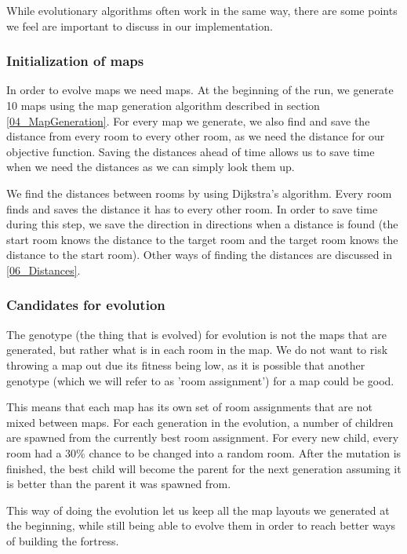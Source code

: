 While evolutionary algorithms often work in the same way, there are some points we feel are important to discuss in our implementation.

\subsubsection{Initialization of maps}
\label{04_Evolution_Initialization}

In order to evolve maps we need maps. At the beginning of the run, we generate 10 maps using the map generation algorithm described in section \ref{04_MapGeneration}. For every map we generate, we also find and save the distance from every room to every other room, as we need the distance for our objective function. Saving the distances ahead of time allows us to save time when we need the distances as we can simply look them up. 

We find the distances between rooms by using Dijkstra's algorithm\cite{Dijkstra}\cite{DijkstraOriginal}. Every room finds and saves the distance it has to every other room. In order to save time during this step, we save the direction in directions when a distance is found (the start room knows the distance to the target room and the target room knows the distance to the start room). Other ways of finding the distances are discussed in \ref{06_Distances}.

\subsubsection{Candidates for evolution}

The genotype (the thing that is evolved) for evolution is not the maps that are generated, but rather what is in each room in the map. We do not want to risk throwing a map out due its fitness being low, as it is possible that another genotype (which we will refer to as 'room assignment') for a map could be good.

This means that each map has its own set of room assignments that are not mixed between maps. For each generation in the evolution, a number of children are spawned from the currently best room assignment. For every new child, every room had a 30\% chance to be changed into a random room. After the mutation is finished, the best child will become the parent for the next generation assuming it is better than the parent it was spawned from.

This way of doing the evolution let us keep all the map layouts we generated at the beginning, while still being able to evolve them in order to reach better ways of building the fortress.

